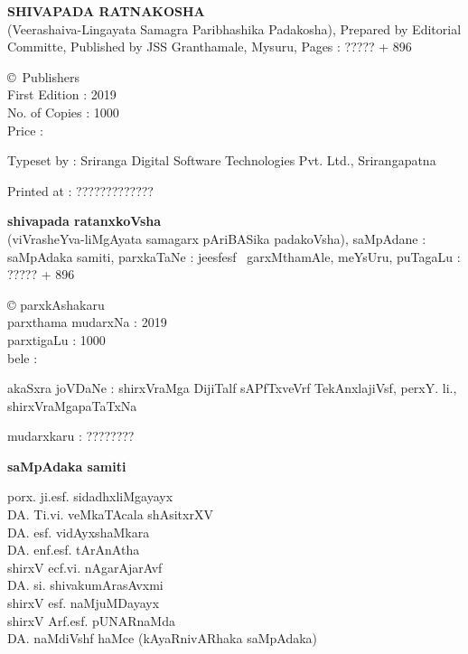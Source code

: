 \thispagestyle{empty}
\noindent
{\rm\sf\bfseries SHIVAPADA RATNAKOSHA}\\[5pt]
{\rm (Veerashaiva-Lingayata Samagra Paribhashika Padakosha)}, {\rm Prepared by Editorial Committe}, {\rm Published by JSS Granthamale, Mysuru,} {\rm Pages : ????? + 896}

\vspace{1cm}

\noindent
{\rm \copyright \ Publishers}\\[7pt]
{\rm First Edition : 2019}\\[7pt]
{\rm No. of Copies : 1000}\\[7pt]
{\rm Price :} \rupee

\bigskip

\noindent
{\rm Typeset by : Sriranga Digital Software Technologies Pvt. Ltd., Srirangapatna}

\medskip

\noindent
{\rm Printed at : ?????????????}

\vfill

\noindent
{\bf\large shivapada ratanxkoVsha}\\[5pt]
(viVrasheYva-liMgAyata samagarx pAriBASika padakoVsha), saMpAdane : saMpAdaka samiti, parxkaTaNe : je{esf}{esf} \ garxMthamAle, meYsUru, puTagaLu : {\rm ????? +} 896

\vspace{1cm}

\noindent
{\rm \copyright} parxkAshakaru\\[7pt]
parxthama mudarxNa : 2019\\[7pt]
parxtigaLu : 1000\\[10pt]
bele : \rupee

\bigskip

\noindent
akaSxra joVDaNe : shirxVraMga DijiTalf sAPfTxveVrf TekAnxlajiVsf, perxY. li., shirxVraMgapaTaTxNa

\medskip

\noindent
mudarxkaru : ????????

\newpage

\thispagestyle{empty}

\phantom{a}

\vfill

\begin{center}
{\Large\bf saMpAdaka samiti}

\bigskip
\medskip

{\fontsize{14pt}{16pt}\selectfont
porx. ji.esf. sidadhxliMgayayx\\[8pt]
DA. Ti.vi. veMkaTAcala shAsitxrXV\\[8pt]
DA. esf. vidAyxshaMkara\\[8pt]
DA. enf.esf. tArAnAtha\\[8pt]
shirxV ecf.vi. nAgarAjarAvf\\[8pt]
DA. si. shivakumArasAvxmi\\[8pt]
shirxV esf. naMjuMDayayx\\[8pt]
shirxV Arf.esf. pUNARnaMda\\[8pt]
DA. naMdiVshf haMce (kAyaRnivARhaka saMpAdaka)}\relax
\end{center}

\vfill

\phantom{a}







